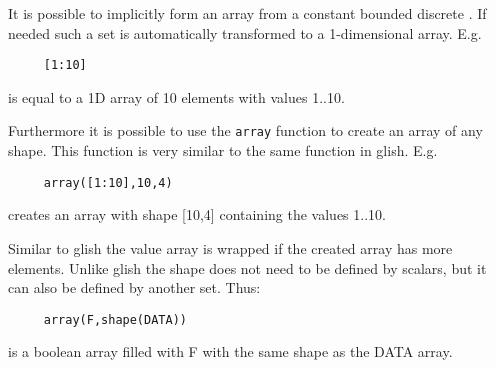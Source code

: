 It is possible to implicitly form an array from a constant bounded discrete
. If needed such a set is automatically
transformed to a 1-dimensional array. E.g.
\begin{verbatim}
     [1:10]
\end{verbatim}
is equal to a 1D array of 10 elements with values 1..10.

Furthermore it is possible to use the \texttt{array} function to
create an array of any shape. This function is very similar to
the same function in glish. E.g.
\begin{verbatim}
     array([1:10],10,4)
\end{verbatim}
creates an array with shape [10,4] containing the values
1..10.

Similar to glish the value array is wrapped if the created
array has more elements. Unlike glish the shape does not need to be
defined by scalars, but it can also be defined by another set. Thus:
\begin{verbatim}
     array(F,shape(DATA))
\end{verbatim}
is a boolean array filled with F with the same shape as the DATA array.


